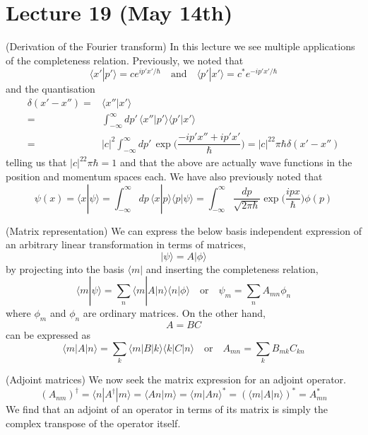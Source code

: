\section{Lecture 19 (May 14th)}
\begin{rmk}
(Derivation of the Fourier transform) In this lecture we see multiple applications of the completeness relation. Previously, we noted that
\[\langle x'|p'\rangle =ce^{ip'x'/\hbar }\quad\mathrm{and}\quad\langle p'|x'\rangle =c^{*}e^{-ip'x'/\hbar }\]
and the quantisation
\begin{align*}
\delta (x'-x'')=&\langle x''|x'\rangle \\
=&\int_{-\infty }^{\infty } dp'\,\langle x''|p'\rangle \langle p'|x'\rangle \\
=&|c|^2\int_{-\infty }^{\infty } dp'\,\exp \Big(\dfrac{-ip'x''+ip'x'}{\hbar }\Big)=|c|^22\pi \hbar \delta (x'-x'')
\end{align*}
telling us that $|c|^22\pi \hbar =1$ and that the above are actually wave functions in the position and momentum spaces each. We have also previously noted that
\[\psi (x)=\langle x|\psi \rangle =\int_{-\infty }^{\infty } dp\,\langle x|p\rangle \langle p|\psi \rangle=\int_{-\infty }^{\infty }\dfrac{dp}{\sqrt{2\pi \hbar }}\exp \Big(\dfrac{ipx}{\hbar }\Big)\phi (p)\]
\end{rmk}
\vspace{2ex}
\begin{prop}
(Matrix representation) We can express the below basis independent expression of an arbitrary linear transformation in terms of matrices,
\[|\psi \rangle =A|\phi \rangle \]
by projecting into the basis $\langle m|$ and inserting the completeness relation,
\[\langle m|\psi \rangle =\sum _{n}\langle m|A|n\rangle \langle n|\phi \rangle \quad \mathrm{or}\quad \psi _{m}=\sum_{n}A_{mn}\phi _{n}\]
where $\phi _{m}$ and $\phi _{n}$ are ordinary matrices. On the other hand,
\[A=BC\]
can be expressed as
\[\langle m|A|n\rangle =\sum _{k}\langle m|B|k\rangle \langle k|C|n\rangle \quad \mathrm{or}\quad A_{mn}=\sum _{k}B_{mk}C_{kn}\]
\end{prop}
\vspace{2ex}
\begin{rmk}
(Adjoint matrices) We now seek the matrix expression for an adjoint operator.
\[(A_{nm})^{\dagger}=\langle n|A^{\dagger}|m\rangle =\langle An|m\rangle =\langle m|An\rangle ^{*}=(\langle m|A|n\rangle )^{*}=A^{*}_{mn}\]
We find that an adjoint of an operator in terms of its matrix is simply the complex transpose of the operator itself.
\end{rmk}
